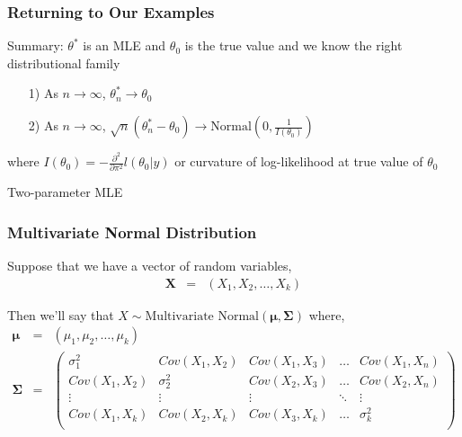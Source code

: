 \documentclass{beamer}
\begin{document}
\begin{frame}
\frametitle{Returning to Our Examples}


Summary: $\theta^{*}$ is an MLE and $\theta_{0}$ is the true value and we know the right distributional family
\begin{itemize}
\item[1)] As $n \rightarrow \infty$,  $\theta^{*}_{n} \rightarrow \theta_{0}$
\item[2)] As $n \rightarrow \infty$, $\sqrt{n}(\theta^{*}_{n} - \theta_{0}) \rightarrow \text{Normal}(0, \frac{1}{I(\theta_{0})})$
\end{itemize}
where $I(\theta_{0} ) =  - \frac{\partial^2}{\partial \pi^2} l(\theta_{0}|y) $ or curvature of log-likelihood at true value of $\theta_{0}$

\end{frame}

\begin{frame}
\huge
Two-parameter MLE


\end{frame}



\begin{frame}
\frametitle{Multivariate Normal Distribution}

Suppose that we have a vector of random variables,
\begin{eqnarray}
\boldsymbol{X} & = & (X_{1}, X_{2}, \hdots, X_{k} ) \nonumber
\end{eqnarray}

Then we'll say that $X \sim \text{Multivariate Normal} (\boldsymbol{\mu}, \boldsymbol{\Sigma})$ where,
\begin{eqnarray}
\boldsymbol{\mu} & = & (\mu_{1}, \mu_{2}, \hdots, \mu_{k}) \nonumber \\
\boldsymbol{\Sigma} & = & \begin{pmatrix}
\sigma^2_{1} &  Cov(X_{1}, X_{2} ) & Cov(X_{1}, X_{3} ) & \hdots & Cov(X_{1}, X_{n} ) \\
Cov(X_{1}, X_{2}) & \sigma^2_{2} & Cov(X_{2}, X_{3} ) & \hdots & Cov(X_{2} , X_{n} ) \\
\vdots & \vdots & \vdots  &\ddots & \vdots \\
Cov(X_{1}, X_{k}) & Cov(X_{2}, X_{k} ) & Cov(X_{3}, X_{k} ) & \hdots & \sigma^2_{k} \\
\end{pmatrix} \nonumber
\end{eqnarray}


\end{frame}
\end{document}
